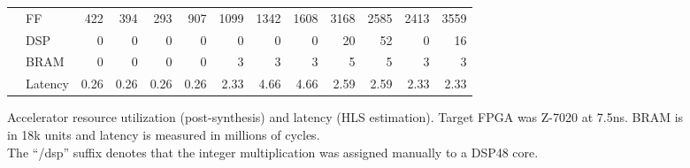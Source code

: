 \begin{figure}[htb!]
{\begin{tabular}{cl rrrr rrrrrrr}
&FF	& 422 & 394 & 293 & 907 & 1099&1342 &1608 &3168 &2585&2413& 3559 \\
&DSP	& 0   & 0   & 0   & 0   & 0   & 0   & 0   & 20  &52  &0   & 16   \\
&BRAM	& 0   & 0   & 0   & 0   & 3   & 3   & 3   & 5   & 5  &3   & 3    \\
&Latency& 0.26& 0.26& 0.26& 0.26& 2.33& 4.66& 4.66& 2.59&2.59&2.33& 2.33 \\
\bottomrule
\end{tabular}
}
\caption{Accelerator resource utilization (post-synthesis) and latency (HLS estimation).
Target FPGA was Z-7020 at 7.5ns. BRAM is in 18k units and latency is measured in millions of cycles.\\
The ``/dsp'' suffix denotes that the integer multiplication was assigned manually to a DSP48 core.}
\label{tab:acc-util}
\end{figure}

